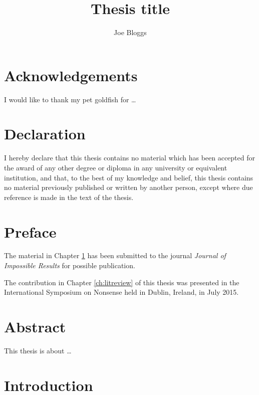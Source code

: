 \documentclass{monashthesis}
\author{Joe Bloggs}
\title{Thesis title}
\begin{document}

\titlepage

{\sf\tighttoc\doublespacing}

\chapter*{Acknowledgements}\label{acknowledgements}

I would like to thank my pet goldfish for \dots

\chapter*{Declaration}\label{declaration}

I hereby declare that this thesis contains no material which has been
accepted for the award of any other degree or diploma in any university
or equivalent institution, and that, to the best of my knowledge and
belief, this thesis contains no material previously published or written
by another person, except where due reference is made in the text of the
thesis.

\vspace*{2cm}\par\authorname

\chapter*{Preface}\label{preface}

The material in Chapter \ref{ch:intro} has been submitted to the journal
\emph{Journal of Impossible Results} for possible publication.

The contribution in Chapter \ref{ch:litreview} of this thesis was
presented in the International Symposium on Nonsense held in Dublin,
Ireland, in July 2015.

\chapter*{Abstract}\label{abstract}

This thesis is about \ldots{}

\clearpage{}\setcounter{page}{0}

\chapter{Introduction}\label{ch:intro}
\end{document}
